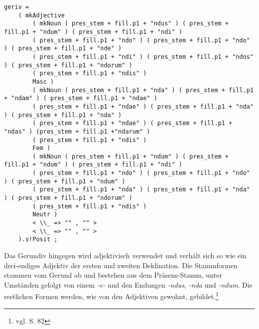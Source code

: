 \begin{lstlisting}[float=h!tp,caption={Ausschnitt aus der Funktion \texttt{mkVerb} um Gerundiv-Verbformen zu bilden (vgl. \textbf{ResLat.gf})},label={GF-Res-MkVerb-Geriv},basicstyle=\small]
      geriv = 
	( mkAdjective
	    ( mkNoun ( pres_stem + fill.p1 + "ndus" ) ( pres_stem + fill.p1 + "ndum" ) ( pres_stem + fill.p1 + "ndi" ) 
		( pres_stem + fill.p1 + "ndo" ) ( pres_stem + fill.p1 + "ndo" ) ( pres_stem + fill.p1 + "nde" ) 
		( pres_stem + fill.p1 + "ndi" ) ( pres_stem + fill.p1 + "ndos" ) ( pres_stem + fill.p1 + "ndorum" ) 
		( pres_stem + fill.p1 + "ndis" ) 
		Masc )
	    ( mkNoun ( pres_stem + fill.p1 + "nda" ) ( pres_stem + fill.p1 + "ndam" ) ( pres_stem + fill.p1 + "ndae" ) 
		( pres_stem + fill.p1 + "ndae" ) ( pres_stem + fill.p1 + "nda" ) ( pres_stem + fill.p1 + "nda" ) 
		( pres_stem + fill.p1 + "ndae" ) ( pres_stem + fill.p1 + "ndas" ) (pres_stem + fill.p1 +"ndarum" ) 
		( pres_stem + fill.p1 + "ndis" ) 
		Fem )
	    ( mkNoun ( pres_stem + fill.p1 + "ndum" ) ( pres_stem + fill.p1 + "ndum" ) ( pres_stem + fill.p1 + "ndi" ) 
		( pres_stem + fill.p1 + "ndo" ) ( pres_stem + fill.p1 + "ndo" ) ( pres_stem + fill.p1 + "ndum" ) 
		( pres_stem + fill.p1 + "nda" ) ( pres_stem + fill.p1 + "nda" ) ( pres_stem + fill.p1 + "ndorum" ) 
		( pres_stem + fill.p1 + "ndis" ) 
		Neutr )
	    < \\_ => "" , "" >
	    < \\_ => "" , "" >
	).s!Posit ;
\end{lstlisting}
Das Gerundiv hingegen wird adjektivisch verwendet und verhält sich so wie ein drei-endiges Adjektiv der ersten und zweiten Deklination. Die Stammformen stammen vom Gerund ab und bestehen aus dem Präsens-Stamm, unter Umständen gefolgt von einem \textit{-e-} und den Endungen \textit{-ndus}, \textit{-nda} und \textit{-ndum}. Die restlichen Formen werden, wie von den Adjektiven gewohnt, gebildet.\footnote{vgl. \cite{BAYER-LINDAUER1994} S. 82} \par
